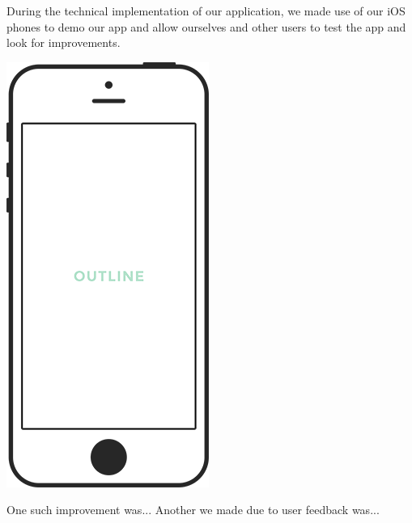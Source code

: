 \documentclass{article}
\begin{document}
\newpage

During the technical implementation of our application, we made use of our iOS phones to demo our app and allow ourselves and other users to test the app and look for improvements.

\begin{center}
	\vspace{1mm}
	\includegraphics[scale=0.2]{placeholder.png}
	\vspace{1mm}
\end{center}

One such improvement was...
Another we made due to user feedback was...
\end{document}

